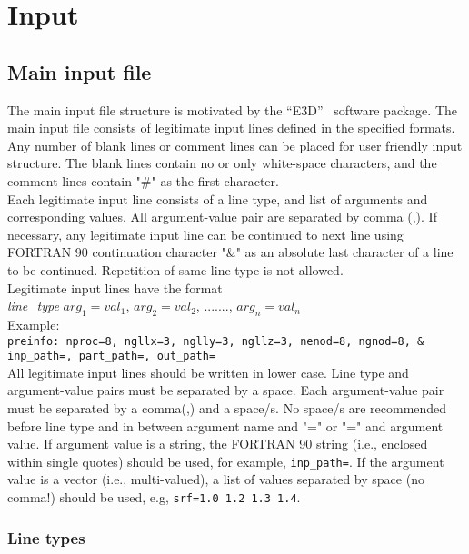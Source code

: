 \chapter{Input}
\label{chap:input}
\section{Main input file}

The main input file structure is motivated by the ``E3D''~\citep{larsen1995} software package. The main input file consists of legitimate input lines defined in the specified formats. Any number of blank lines or comment lines can be placed for user friendly input structure. The blank lines contain no or only white-space characters, and the comment lines contain "\#" as the first character. \\

Each legitimate input line consists of a line type, and list of arguments and corresponding values. All argument-value pair are separated by comma (,). If necessary, any legitimate input line can be continued to next line using FORTRAN 90 continuation  character "\&" as an absolute last character of a line to be continued. Repetition of same line type is not allowed.\\

Legitimate input lines have the format\\
{\it{line\_type}} $arg_1=val_1$, $arg_2=val_2$, ......., $arg_n=val_n$\\

Example:\\
\texttt{preinfo: nproc=8, ngllx=3, nglly=3, ngllz=3, nenod=8, ngnod=8, \& \\
inp\_path=, part\_path=, out\_path=}\\

All legitimate input lines should be written in lower case. Line type and argument-value pairs must be separated by a space. Each argument-value pair must be separated by a comma(,) and a space/s. No space/s are recommended before line type and in between argument name and "=" or "=" and argument value. If argument value is a string, the FORTRAN 90 string (i.e., enclosed within single quotes) should be used, for example, \texttt{inp\_path=}. If the argument value is a vector (i.e., multi-valued), a list of values separated by space (no comma!) should be used, e.g, \texttt{srf=1.0 1.2 1.3 1.4}.

\subsection{Line types}

